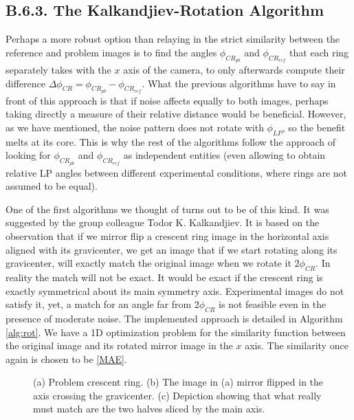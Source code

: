 \documentclass[11pt, a4paper, twoside]{article} %
\begin{document}
\subsection*{B.6.3. The Kalkandjiev-Rotation Algorithm}
Perhaps a more robust option than relaying in the strict similarity between the reference and problem images is to find the angles $\phi_{CR_{pb}}$ and $\phi_{CR_{ref}}$ that each ring separately takes with the $x$ axis of the camera, to only afterwards compute their difference $\Delta \phi_{CR}=\phi_{CR_{pb}}-\phi_{CR_{ref}}$. What the previous algorithms have to say in front of this approach is that if noise affects equally to both images, perhaps taking directly a measure of their relative distance would be beneficial. However, as we have mentioned, the noise pattern does not rotate with $\phi_{LP}$, so the benefit melts at its core. This is why the rest of the algorithms follow the approach of looking for $\phi_{CR_{pb}}$ and $\phi_{CR_{ref}}$ as independent entities (even allowing to obtain relative LP angles between different experimental conditions, where rings are not assumed to be equal).

One of the first algorithms we thought of turns out to be of this kind. It was suggested by the group colleague Todor K. Kalkandjiev. It is based on the observation that if we mirror flip a crescent ring image in the horizontal axis aligned with its gravicenter, we get an image that if we start rotating along its gravicenter, will exactly match the original image when we rotate it $2\phi_{CR}$. In reality the match will not be exact. It would be exact if the crescent ring is exactly symmetrical about its main symmetry axis. Experimental images do not satisfy it, yet, a match for an angle far from $2\phi_{CR}$ is not feasible even in the presence of moderate noise. The implemented approach is detailed in Algorithm \ref{alg:rot}. We have a 1D optimization problem for the similarity function between the original image and its rotated mirror image in the $x$ axis. The similarity once again is chosen to be \eqref{MAE}.

\begin{figure}[h!] 
     \centering 
    \caption{(a) Problem crescent ring. (b) The image in (a) mirror flipped in the axis crossing the gravicenter. (c) Depiction showing that what really must match are the two halves sliced by the main axis.}
    \label{fig:kalk}
\end{figure}
\end{document}
